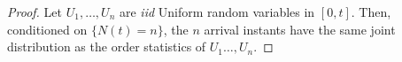 \documentclass[a4paper,10pt]{article}
\theoremstyle{plain}
\theoremstyle{definition}
\begin{document}
\begin{proof}
Let $U_{1},\ldots,U_{n}$ are \emph{iid} Uniform random variables in $[0,t]$. Then, conditioned on $\{N(t)=n\}$, the $n$ arrival instants have the same joint distribution as the order statistics  of $U_1 \ldots, U_n$.
\end{proof}
\end{document}
